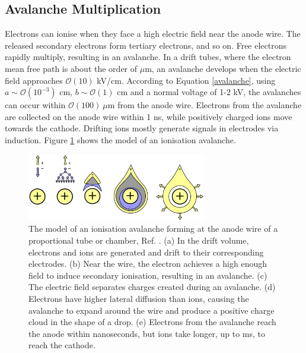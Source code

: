 \subsection{Avalanche Multiplication}
Electrons can ionise when they face a high electric field near the anode wire. 
The released secondary electrons form tertiary electrons, and so on. Free electrons rapidly multiply, 
resulting in an avalanche. In a drift tubes, where the electron mean free path is about the order of $\mu$m, 
an avalanche develops when the electric field approaches $\mathcal{O}(10)$ kV/cm. 
According to Equation \ref{avalanche}, using $a \sim \mathcal{O}(10^{-3})$ cm, $b \sim \mathcal{O}(1)$ cm and
a normal voltage of 1-2 kV, the avalanches can occur within $\mathcal{O}(100) \ \mu$m from the anode wire. 
Electrons from the avalanche are collected on the anode wire within 1 ns, while positively charged ions move towards the cathode.
Drifting ions mostly generate signals in electrodes via induction. Figure \ref{fig:avalanche} shows the model of an ionisation avalanche.
\begin{figure}[!h]
    \centering
    \includegraphics[width =0.7\textwidth]{figures/png/Screenshot_20240330_182509.png}
    \caption{The model of an ionisation avalanche forming at the anode wire of a proportional tube or chamber, Ref. \cite{kola}. 
    (a) In the drift volume, electrons and ions are generated and drift to their corresponding electrodes. 
    (b) Near the wire, the electron achieves a high enough field to induce secondary ionisation, resulting in an avalanche. 
    (c) The electric field separates charges created during an avalanche. 
    (d) Electrons have higher lateral diffusion than ions, causing the avalanche to expand 
    around the wire and produce a positive charge cloud in the shape of a drop. 
    (e) Electrons from the avalanche reach the anode within nanoseconds, but ions take longer, up to ms, to reach the cathode.}
    \label{fig:avalanche}
\end{figure}
